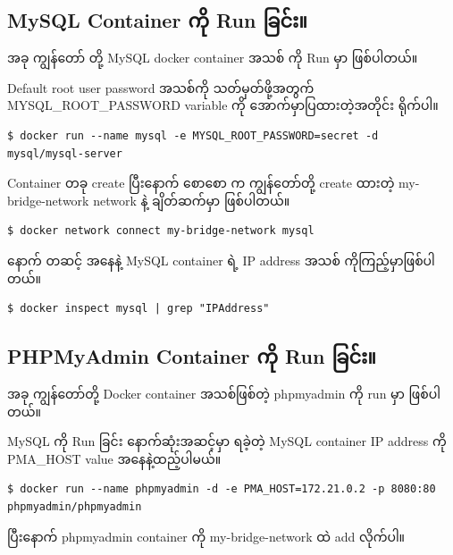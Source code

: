 \hypertarget{mysql-container-ux1000ux102dux102f-run-ux1001ux103cux1004ux103aux1038-1}{%
\subsection{MySQL Container ကို Run
ခြင်း။}\label{mysql-container-ux1000ux102dux102f-run-ux1001ux103cux1004ux103aux1038-1}}

အခု ကျွန်တော် တို့ MySQL docker container အသစ် ကို Run မှာ ဖြစ်ပါတယ်။

Default root user password အသစ်ကို သတ်မှတ်ဖို့အတွက်
MYSQL\_ROOT\_PASSWORD variable ကို အောက်မှာပြထားတဲ့အတိုင်း ရိုက်ပါ။

\begin{verbatim}
$ docker run --name mysql -e MYSQL_ROOT_PASSWORD=secret -d mysql/mysql-server
\end{verbatim}

Container တခု create ပြီးနောက် စောစော က ကျွန်တော်တို့ create ထားတဲ့
my-bridge-network network နဲ့ ချိတ်ဆက်မှာ ဖြစ်ပါတယ်။

\begin{verbatim}
$ docker network connect my-bridge-network mysql
\end{verbatim}

နောက် တဆင့် အနေနဲ့ MySQL container ရဲ့ IP address အသစ်
ကိုကြည့်မှာဖြစ်ပါတယ်။

\begin{verbatim}
$ docker inspect mysql | grep "IPAddress"
\end{verbatim}

\hypertarget{phpmyadmin-container-ux1000ux102dux102f-run-ux1001ux103cux1004ux103aux1038-1}{%
\subsection{PHPMyAdmin Container ကို Run
ခြင်း။}\label{phpmyadmin-container-ux1000ux102dux102f-run-ux1001ux103cux1004ux103aux1038-1}}

အခု ကျွန်တော်တို့ Docker container အသစ်ဖြစ်တဲ့ phpmyadmin ကို run မှာ
ဖြစ်ပါတယ်။

MySQL ကို Run ခြင်း နောက်ဆုံးအဆင့်မှာ ရခဲ့တဲ့ MySQL container IP address
ကို PMA\_HOST value အနေနဲ့ထည့်ပါမယ်။

\begin{verbatim}
$ docker run --name phpmyadmin -d -e PMA_HOST=172.21.0.2 -p 8080:80 phpmyadmin/phpmyadmin
\end{verbatim}

ပြီးနောက် phpmyadmin container ကို my-bridge-network ထဲ add လိုက်ပါ။

